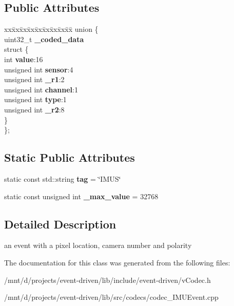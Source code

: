 \subsection*{Public Attributes}
\begin{DoxyCompactItemize}
\item 
\mbox{\label{classev_1_1IMUevent_afb248b213266090a435ff4880b73f0de}} 
\begin{tabbing}
xx\=xx\=xx\=xx\=xx\=xx\=xx\=xx\=xx\=\kill
union \{\\
\>uint32\_t {\bfseries \_coded\_data}\\
\mbox{\label{unionev_1_1IMUevent_1_1_0D17_a89bbdc2184dc700fff35e8caeead3527}} 
\>struct \{\\
\>\>int {\bfseries value}:16\\
\>\>unsigned int {\bfseries sensor}:4\\
\>\>unsigned int {\bfseries \_r1}:2\\
\>\>unsigned int {\bfseries channel}:1\\
\>\>unsigned int {\bfseries type}:1\\
\>\>unsigned int {\bfseries \_r2}:8\\
\>\} \\
\}; \\

\end{tabbing}\end{DoxyCompactItemize}
\subsection*{Static Public Attributes}
\begin{DoxyCompactItemize}
\item 
\mbox{\label{classev_1_1IMUevent_a12ea90ffb6df46ef808eeed4df65fdf1}} 
static const std\+::string {\bfseries tag} = \char`\"{}I\+M\+US\char`\"{}
\item 
\mbox{\label{classev_1_1IMUevent_a95583a57a83bd5fb5363d9ee7085a050}} 
static const unsigned int {\bfseries \+\_\+max\+\_\+value} = 32768
\end{DoxyCompactItemize}


\subsection{Detailed Description}
an event with a pixel location, camera number and polarity 

The documentation for this class was generated from the following files\+:\begin{DoxyCompactItemize}
\item 
/mnt/d/projects/event-\/driven/lib/include/event-\/driven/v\+Codec.\+h\item 
/mnt/d/projects/event-\/driven/lib/src/codecs/codec\+\_\+\+I\+M\+U\+Event.\+cpp\end{DoxyCompactItemize}
